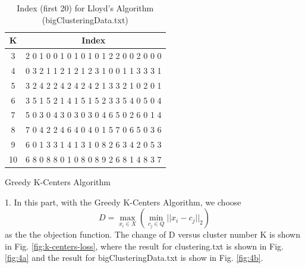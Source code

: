 \begin{description}
\begin{description}
\begin{table}[H]
	\centering
	\caption{Index (first 20) for Lloyd's Algorithm (bigClusteringData.txt)}
	\label{table:index_kmeans_bigClustering}	
	\begin{tabular}{ c | c }
		\hline \hline
		K    & Index \\[0.1cm]
		\hline
		3     &  2  0  1  0  0  1  0  1  0  1  0  1  2  2  0  0  2  0  0  0 \\[0.1cm]
		4     &  0  3  2  1  1  2  1  2  1  2  3  1  0  0  1  1  3  3  3  1 \\[0.1cm]
		5     &  3  2  4  2  2  4  2  4  2  4  2  1  3  3  2  1  0  2  0  1 \\[0.1cm]
		6     &  3  5  1  5  2  1  4  1  5  1  5  2  3  3  5  4  0  5  0  4 \\[0.1cm]
		7     &  5  0  3  0  4  3  0  3  0  3  0  4  6  5  0  2  6  0  1  4 \\[0.1cm]
		8     &  7  0  4  2  2  4  6  4  0  4  0  1  5  7  0  6  5  0  3  6 \\[0.1cm]
		9     &  6  0  1  3  3  1  4  1  3  1  0  8  2  6  3  4  2  0  5  3 \\[0.1cm]
		10   &  6  8  0  8  8  0  1  0  8  0  8  9  2  6  8  1  4  8  3  7 \\[0.1cm]
		\hline	
	\end{tabular}
\end{table}

\end{description}

\newpage
\item[(\Romannum{2}).] Greedy K-Centers Algorithm

\begin{description}
\item{1.} In this part, with the Greedy K-Centers Algorithm, we choose 
$$D = \underset{x_i \in X}{\max}( \underset{c_j \in Q}{\min}{||x_i - c_j||_2})$$
as the the objection function. The change of D versus cluster number K is shown in Fig. \ref{fig:k-centers-loss}, where the result for clustering.txt is shown in Fig. \ref{fig:4a} and the result for bigClusteringData.txt is show in Fig. \ref{fig:4b}.


\end{description}
\end{description}
